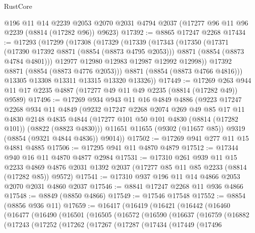 \begin{lexlean}{RustCore}
\begin{coremodule}
    @196
    @11
    @14
    @2239
    @2053
    @2070
    @2031
    @4794
    @2037
    (@17277 @96 @11 @96 @2239 (@8814 (@17282 @96)) @9623)
@17392 := @8865 @17247 @2268
@17434 := @17293
    (@17299
      (@17308
        (@17329
          (@17339
            (@17343
              (@17350
                (@17371
                  (@17390 @17392 @8871 (@8854 (@8873 @4795 @2053)))
                  @8871
                  (@8854 (@8873 @4784 @4801)))
                @12977
                @12980
                @12983
                @12987
                @12992
                @12998))
            @17392
            @8871
            (@8854 (@8873 @4776 @2053)))
          @8871
          (@8854 (@8873 @4766 @4816)))
        @13305
        @13308
        @13311
        @13315
        @13320
        @13326))
@17449 := @17269 @263 @944 @11 @17 @2235 @4887 (@17277 @49 @11 @49 @2235 (@8814 (@17282 @49)) @9589)
@17496 := @17269
    @934
    @943
    @11
    @16
    @4849
    @4886
    (@9223
      @17247
      @2268
      @934
      @11
      @4849
      (@9232
        @17247
        @2268
        @2074
        @269
        @49
        @85
        @17
        @11
        @4830
        @2148
        @4835
        @4844
        (@17277 @101 @50 @101 @4830 (@8814 (@17282 @101)) (@8822 (@8823 @4830)))
        @11651
        @11655
        (@9302 (@11657 @85))
        @9319
        (@8854 (@9321 @4844 @4836))
        @9014))
@17502 := @17269 @941 @277 @11 @15 @4881 @4885
@17506 := @17295 @941 @11 @4870 @4879
@17512 := @17344 @940 @16 @11 @4870 @4877 @2984
@17531 := @17310
    @261
    @939
    @11
    @15
    @2233
    @4869
    @4876
    @2031
    @1392
    @2037
    (@17277 @85 @11 @85 @2233 (@8814 (@17282 @85)) @9572)
@17541 := @17310 @937 @196 @11 @14 @4866 @2053 @2070 @2031 @4860 @2037
@17546 := @8841 @17247 @2268 @11 @936 @4866
@17548 := @8849 (@8850 @4866)
@17549 := @17546 @17548
@17552 := @8854 (@8856 @936 @11)
@17659 := @16417
    (@16419
      (@16421
        (@16442
          (@16460
            (@16477
              (@16490
                (@16501
                  (@16505
                    (@16572
                      (@16590
                        (@16637
                          (@16759
                            (@16882
                              (@17243
                                (@17252
                                  (@17262
                                    (@17267
                                      (@17287
                                        (@17434
                                          (@17449
                                            (@17496

\end{coremodule}
\end{lexlean}
